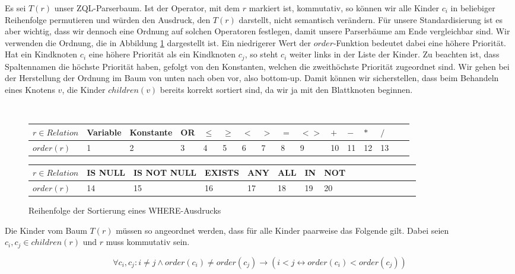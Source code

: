 Es sei $T(r)$ unser ZQL-Parserbaum. Ist der Operator, mit dem $r$ markiert ist, kommutativ, so können wir alle Kinder $c_i$ in beliebiger Reihenfolge permutieren und würden den Ausdruck, den $T(r)$ darstellt, nicht semantisch verändern. Für unsere Standardisierung ist es aber wichtig, dass wir dennoch eine Ordnung auf solchen Operatoren festlegen, damit unsere Parserbäume am Ende vergleichbar sind. Wir verwenden die Ordnung, die in Abbildung \ref{fig:sortorder} dargestellt ist. Ein niedrigerer Wert der $\mathit{order}$-Funktion bedeutet dabei eine höhere Priorität. Hat ein Kindknoten $c_i$ eine höhere Priorität als ein Kindknoten $c_j$, so steht $c_i$ weiter links in der Liste der Kinder. Zu beachten ist, dass Spaltennamen die höchste Priorität haben, gefolgt von den Konstanten, welchen die zweithöchste Priorität zugeordnet sind. Wir gehen bei der Herstellung der Ordnung im Baum von unten nach oben vor, also bottom-up. Damit können wir sicherstellen, dass beim Behandeln eines Knotens $v$, die Kinder $children(v)$ bereits korrekt sortiert sind, da wir ja mit den Blattknoten beginnen.

\begin{figure}[H]\
\begin{tabular}{|l|l|l|l|l|l|l|l|l|l|l|l|l|l|l|l|}
\hline
$r\in \textit{Relation}$ & Variable & Konstante & OR & $\le$ & $\ge$ & $<$ & $>$ & $=$& $<>$ & $+$ & $-$ & $*$ & $/$\\\hline
$\textit{order}(r)$ & 1 & 2 & 3 & 4 & 5 & 6 & 7 & 8 & 9 & 10 & 11 & 12 & 13\\ 
\hline
\end{tabular}\newline
\begin{tabular}{|l|l|l|l|l|l|l|l|l|l|l|l|l|l|l|l|}
\hline 
$r\in \textit{Relation}$ & IS NULL &  IS NOT NULL & EXISTS & ANY & ALL & IN & NOT \\\hline
$\textit{order}(r)$ & 14 & 15 & 16 & 17 & 18 & 19 & 20\\ 
\hline
\end{tabular}
\caption{Reihenfolge der Sortierung eines WHERE-Ausdrucks}
\label{fig:sortorder}
\end{figure}

Die Kinder vom Baum $T(r)$ müssen so angeordnet werden, dass für alle Kinder paarweise das Folgende gilt. Dabei seien $c_i,c_j\in\mathit{children}(r)$ und $r$ muss kommutativ sein.

$$\forall c_i,c_j : i\neq j \wedge order(c_i) \neq order(c_j) \to  ( i<j \leftrightarrow order(c_i) < order(c_j) ) $$

